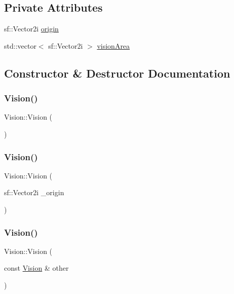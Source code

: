 \subsection*{Private Attributes}
\begin{DoxyCompactItemize}
\item 
sf\+::\+Vector2i \mbox{\hyperlink{class_vision_ab68e6f7a554cda7c398168ca150dd4c0}{origin}}
\item 
std\+::vector$<$ sf\+::\+Vector2i $>$ \mbox{\hyperlink{class_vision_a04430228cfbaaa15871d28a68ad7e1b1}{vision\+Area}}
\end{DoxyCompactItemize}


\subsection{Constructor \& Destructor Documentation}
\mbox{\label{class_vision_ad6899fb359fd485afbd309d6d7b0ae1f}} 
\subsubsection{\texorpdfstring{Vision()}{Vision()}\hspace{0.1cm}{\footnotesize\ttfamily [1/3]}}
{\footnotesize\ttfamily Vision\+::\+Vision (\begin{DoxyParamCaption}{ }\end{DoxyParamCaption})}

\mbox{\label{class_vision_a8a9d1c5ab532eb9318d41e10586ecc34}} 
\subsubsection{\texorpdfstring{Vision()}{Vision()}\hspace{0.1cm}{\footnotesize\ttfamily [2/3]}}
{\footnotesize\ttfamily Vision\+::\+Vision (\begin{DoxyParamCaption}\item[{sf\+::\+Vector2i}]{\+\_\+origin }\end{DoxyParamCaption})}

\mbox{\label{class_vision_adf510da4361cd8d1c5fa689e41088d62}} 
\subsubsection{\texorpdfstring{Vision()}{Vision()}\hspace{0.1cm}{\footnotesize\ttfamily [3/3]}}
{\footnotesize\ttfamily Vision\+::\+Vision (\begin{DoxyParamCaption}\item[{const \mbox{\hyperlink{class_vision}{Vision}} \&}]{other }\end{DoxyParamCaption})}



